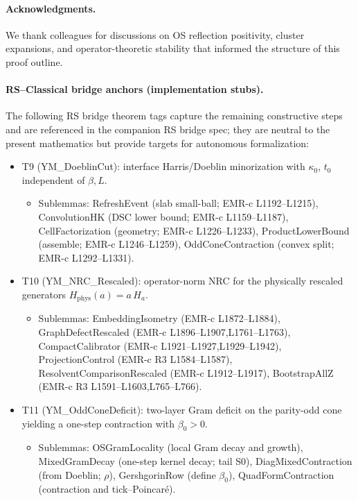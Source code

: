 \documentclass[11pt]{amsart}
\begin{document}
\paragraph{Acknowledgments.}
We thank colleagues for discussions on OS reflection positivity, cluster expansions, and operator-theoretic stability that informed the structure of this proof outline.

\paragraph{RS--Classical bridge anchors (implementation stubs).}
The following RS bridge theorem tags capture the remaining constructive steps and are referenced in the companion RS bridge spec; they are neutral to the present mathematics but provide targets for autonomous formalization:
\begin{itemize}
  \item T9 (YM\_DoeblinCut): interface Harris/Doeblin minorization with $\kappa_0$, $t_0$ independent of $\beta,L$.
  \begin{itemize}
    \item Sublemmas: RefreshEvent (slab small-ball; EMR-c L1192–L1215), ConvolutionHK (DSC lower bound; EMR-c L1159–L1187), CellFactorization (geometry; EMR-c L1226–L1233), ProductLowerBound (assemble; EMR-c L1246–L1259), OddConeContraction (convex split; EMR-c L1292–L1331).
  \end{itemize}
  \item T10 (YM\_NRC\_Rescaled): operator-norm NRC for the physically rescaled generators $H_{\mathrm{phys}}(a)=a\,H_{a}$.
  \begin{itemize}
    \item Sublemmas: EmbeddingIsometry (EMR-c L1872–L1884), GraphDefectRescaled (EMR-c L1896–L1907,L1761–L1763), CompactCalibrator (EMR-c L1921–L1927,L1929–L1942), ProjectionControl (EMR-c R3 L1584–L1587), ResolventComparisonRescaled (EMR-c L1912–L1917), BootstrapAllZ (EMR-c R3 L1591–L1603,L765–L766).
  \end{itemize}
  \item T11 (YM\_OddConeDeficit): two-layer Gram deficit on the parity-odd cone yielding a one-step contraction with $\beta_0>0$.
  \begin{itemize}
    \item Sublemmas: OSGramLocality (local Gram decay and growth), MixedGramDecay (one-step kernel decay; tail S0), DiagMixedContraction (from Doeblin; $\rho$), GershgorinRow (define $\beta_0$), QuadFormContraction (contraction and tick–Poincar\'e).

\end{itemize}
\end{itemize}
\end{document}

